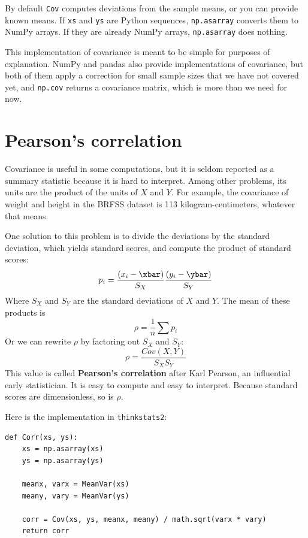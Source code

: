 By default {\tt Cov} computes deviations from the sample means,
or you can provide known means.  If {\tt xs} and {\tt ys} are
Python sequences, {\tt np.asarray} converts them to NumPy arrays.
If they are already NumPy arrays, {\tt np.asarray} does nothing.

This implementation of covariance is meant to be simple for purposes
of explanation.  NumPy and pandas also provide implementations of
covariance, but both of them apply a correction for small sample sizes
that we have not covered yet, and {\tt np.cov} returns a covariance
matrix, which is more than we need for now.


\section{Pearson's correlation}

Covariance is useful in some computations, but it is seldom reported
as a summary statistic because it is hard to interpret.  Among other
problems, its units are the product of the units of $X$ and $Y$.  For
example, the covariance of weight and height in the BRFSS dataset is
113 kilogram-centimeters, whatever that means.

One solution to this problem is to divide the deviations by the standard
deviation, which yields standard scores, and compute the product of
standard scores:
%
\[ p_i = \frac{(x_i - \xbar)}{S_X} \frac{(y_i - \ybar)}{S_Y} \]
%
Where $S_X$ and $S_Y$ are the standard deviations of $X$ and $Y$.
The mean of these products is 
%
\[ \rho = \frac{1}{n} \sum p_i \]
%
Or we can rewrite $\rho$ by factoring out $S_X$ and
$S_Y$:
%
\[ \rho = \frac{Cov(X,Y)}{S_X S_Y} \]
%
This value is called {\bf Pearson's correlation} after Karl Pearson,
an influential early statistician.  It is easy to compute and easy to
interpret.  Because standard scores are dimensionless, so is $\rho$.

Here is the implementation in {\tt thinkstats2}:

\begin{verbatim}
def Corr(xs, ys):
    xs = np.asarray(xs)
    ys = np.asarray(ys)

    meanx, varx = MeanVar(xs)
    meany, vary = MeanVar(ys)

    corr = Cov(xs, ys, meanx, meany) / math.sqrt(varx * vary)
    return corr
\end{verbatim}

